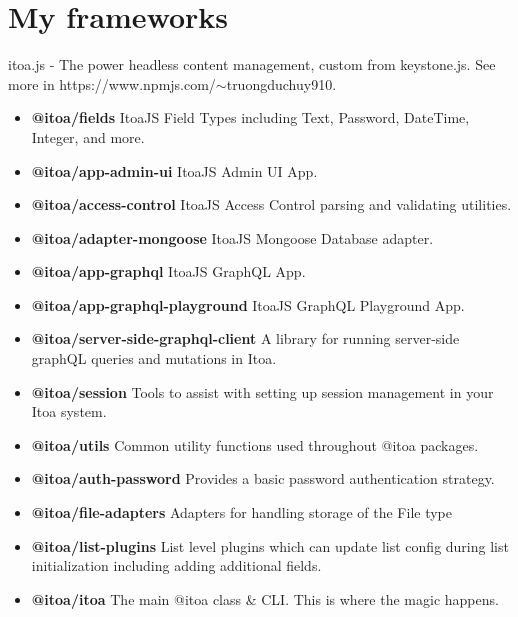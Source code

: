 \documentclass[10pt]{article} %
\begin{document}
\section{My frameworks}
itoa.js - The power headless content management, custom from keystone.js. See more in https://www.npmjs.com/$\sim$truongduchuy910.
\begin{itemize}
  \item \textbf{@itoa/fields} ItoaJS Field Types including Text, Password, DateTime, Integer, and more.
  \item \textbf{@itoa/app-admin-ui} ItoaJS Admin UI App.
  \item \textbf{@itoa/access-control} ItoaJS Access Control parsing and validating utilities.
  \item \textbf{@itoa/adapter-mongoose} ItoaJS Mongoose Database adapter.
  \item \textbf{@itoa/app-graphql} ItoaJS GraphQL App.
  \item \textbf{@itoa/app-graphql-playground} ItoaJS GraphQL Playground App.
  \item \textbf{@itoa/server-side-graphql-client} A library for running server-side graphQL queries and mutations in Itoa.
  \item \textbf{@itoa/session} Tools to assist with setting up session management in your Itoa system.
  \item \textbf{@itoa/utils} Common utility functions used throughout @itoa packages.
  \item \textbf{@itoa/auth-password} Provides a basic password authentication strategy.
  \item \textbf{@itoa/file-adapters} Adapters for handling storage of the File type
  \item \textbf{@itoa/list-plugins} List level plugins which can update list config during list initialization including adding additional fields.
  \item \textbf{@itoa/itoa} The main @itoa class \& CLI. This is where the magic happens.
\end{itemize}
\end{document}
